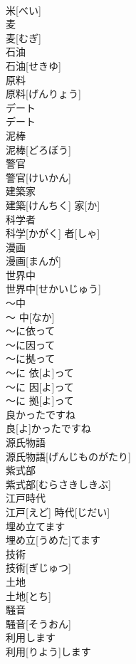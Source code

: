 \documentclass[8pt]{extreport}
\begin{document}
\begin{CJK}{UTF8}{min}
\\	米[べい]	
\\	麦	
\\	麦[むぎ]	
\\	石油	
\\	石油[せきゆ]	
\\	原料	
\\	原料[げんりょう]	
\\	デート	
\\	デート	
\\	泥棒	
\\	泥棒[どろぼう]	
\\	警官	
\\	警官[けいかん]	
\\	建築家	
\\	建築[けんちく] 家[か]	
\\	科学者	
\\	科学[かがく] 者[しゃ]	
\\	漫画	
\\	漫画[まんが]	
\\	世界中	
\\	世界中[せかいじゅう]	
\\	〜中	
\\	〜 中[なか]	
\\	〜に依って
\\	〜に因って
\\	〜に拠って	
\\	〜に 依[よ]って
\\	〜に 因[よ]って
\\	〜に 拠[よ]って	
\\	良かったですね	
\\	良[よ]かったですね	
\\	源氏物語	
\\	源氏物語[げんじものがたり]	
\\	紫式部	
\\	紫式部[むらさきしきぶ]	
\\	江戸時代	
\\	江戸[えど] 時代[じだい]	
\\	埋め立てます	
\\	埋め立[うめた]てます	
\\	技術	
\\	技術[ぎじゅつ]	
\\	土地	
\\	土地[とち]	
\\	騒音	
\\	騒音[そうおん]	
\\	利用します	
\\	利用[りよう]します	

\end{CJK}
\end{document}
